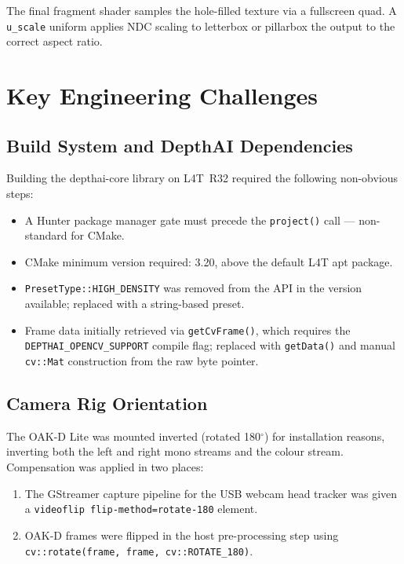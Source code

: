\documentclass[11pt, a4paper]{report}
\begin{document}
The final fragment shader samples the hole-filled texture via a
fullscreen quad.
A \texttt{u\_scale} uniform applies NDC scaling to letterbox or
pillarbox the output to the correct aspect ratio.

\chapter{Key Engineering Challenges}

\section{Build System and DepthAI Dependencies}

Building the depthai-core library on L4T~R32 required the following
non-obvious steps:

\begin{itemize}[noitemsep]
    \item A Hunter package manager gate must precede the
          \texttt{project()} call --- non-standard for CMake.
    \item CMake minimum version required: 3.20, above the default L4T
          apt package.
    \item \texttt{PresetType::HIGH\_DENSITY} was removed from the API
          in the version available; replaced with a string-based preset.
    \item Frame data initially retrieved via \texttt{getCvFrame()}, which
          requires the \texttt{DEPTHAI\_OPENCV\_SUPPORT} compile flag;
          replaced with \texttt{getData()} and manual \texttt{cv::Mat}
          construction from the raw byte pointer.
\end{itemize}

\section{Camera Rig Orientation}

The OAK-D Lite was mounted inverted (rotated 180$^\circ$) for
installation reasons, inverting both the left and right mono streams and
the colour stream.
Compensation was applied in two places:

\begin{enumerate}[noitemsep]
    \item The GStreamer capture pipeline for the USB webcam head tracker
          was given a \texttt{videoflip flip-method=rotate-180} element.
    \item OAK-D frames were flipped in the host pre-processing step
          using \texttt{cv::rotate(frame, frame, cv::ROTATE\_180)}.
\end{enumerate}
\end{document}
